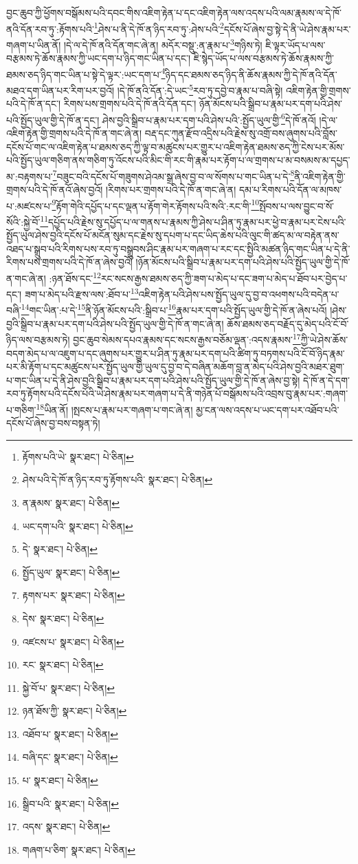 བྱང་ཆུབ་ཀྱི་ཕྱོགས་བསྒོམས་པའི་དབང་གིས་འཇིག་རྟེན་པ་དང་འཇིག་རྟེན་ལས་འདས་པའི་ལམ་རྣམས་ལ་དེ་ཁོ་ནའི་དོན་རབ་ཏུ་:རྟོགས་པའི་\footnote{རྟོགས་པའི་ཡེ་  སྣར་ཐང་།  པེ་ཅིན། }ཤེས་པ་ནི་དེ་ཁོ་ན་ཉིད་རབ་ཏུ་:ཤེས་པའི་\footnote{ཤེས་པའི་དེ་ཁོ་ན་ཉིད་རབ་ཏུ་རྟོགས་པའི་  སྣར་ཐང་།  པེ་ཅིན། }དངོས་པོ་ཞེས་བྱ་སྟེ་དེ་ནི་ཡེ་ཤེས་རྣམ་པར་གཞག་པ་ཡིན་ནོ། །དེ་ལ་དེ་ཁོ་ནའི་དོན་གང་ཞེ་ན། མདོར་བསྡུ་:ན་རྣམ་པ་\footnote{ན་རྣམས་  སྣར་ཐང་།  པེ་ཅིན། }གཉིས་ཏེ། ཇི་ལྟར་ཡོད་པ་ལས་བརྩམས་ཏེ་ཆོས་རྣམས་ཀྱི་ཡང་དག་པ་ཉིད་གང་ཡིན་པ་དང་། ཇི་སྙེད་ཡོད་པ་ལས་བརྩམས་ཏེ་ཆོས་རྣམས་ཀྱི་ཐམས་ཅད་ཉིད་གང་ཡིན་པ་སྟེ་དེ་ལྟར་:ཡང་དག་པ་\footnote{ཡང་དག་པའི་  སྣར་ཐང་།  པེ་ཅིན། }ཉིད་དང་ཐམས་ཅད་ཉིད་ནི་ཆོས་རྣམས་ཀྱི་དེ་ཁོ་ནའི་དོན་མཐའ་དག་ཡིན་པར་རིག་པར་བྱའོ། །དེ་ཁོ་ནའི་དོན་:དེ་ཡང་\footnote{དེ་  སྣར་ཐང་།  པེ་ཅིན། }རབ་ཏུ་དབྱེ་བ་རྣམ་པ་བཞི་སྟེ། འཇིག་རྟེན་གྱི་གྲགས་པའི་དེ་ཁོ་ན་དང་། རིགས་པས་གྲགས་པའི་དེ་ཁོ་ནའི་དོན་དང་། ཉོན་མོངས་པའི་སྒྲིབ་པ་རྣམ་པར་དག་པའི་ཤེས་པའི་སྤྱོད་ཡུལ་གྱི་དེ་ཁོ་ན་དང་། ཤེས་བྱའི་སྒྲིབ་པ་རྣམ་པར་དག་པའི་ཤེས་པའི་:སྤྱོད་ཡུལ་གྱི་\footnote{སྤྱོད་ཡུལ་  སྣར་ཐང་།  པེ་ཅིན། }དེ་ཁོ་ནའོ། །དེ་ལ་འཇིག་རྟེན་གྱི་གྲགས་པའི་དེ་ཁོ་ན་གང་ཞེ་ན། བརྡ་དང་ཀུན་རྫོབ་འདྲིས་པའི་རྗེས་སུ་འགྲོ་བས་ཞུགས་པའི་བློས་དངོས་པོ་གང་ལ་འཇིག་རྟེན་པ་ཐམས་ཅད་ཀྱི་ལྟ་བ་མཚུངས་པར་གྱུར་པ་འཇིག་རྟེན་ཐམས་ཅད་ཀྱི་ངེས་པར་མོས་པའི་སྤྱོད་ཡུལ་གཅིག་ནས་གཅིག་ཏུ་འོངས་པའི་མིང་གི་རང་གི་རྣམ་པར་རྟོག་པ་ལ་གྲགས་པ་མ་བསམས་མ་དཔྱད་མ་:བརྟགས་པ་\footnote{རྟགས་པར་  སྣར་ཐང་།  པེ་ཅིན། }བཟུང་བའི་དངོས་པོ་གཟུགས་ཤེའམ་སྒྲ་ཞེས་བྱ་བ་ལ་སོགས་པ་གང་ཡིན་པ་དེ་\footnote{དེས་  སྣར་ཐང་།  པེ་ཅིན། }ནི་འཇིག་རྟེན་གྱི་གྲགས་པའི་དེ་ཁོ་ནའོ་ཞེས་བྱའོ། །རིགས་པར་གྲགས་པའི་དེ་ཁོ་ན་གང་ཞེ་ན། དམ་པ་རིགས་པའི་དོན་ལ་མཁས་པ་:མཛངས་པ་\footnote{འཛངས་པ་  སྣར་ཐང་།  པེ་ཅིན། }རྟོག་གེའི་དཔྱོད་པ་དང་ལྡན་པ་རྟོག་གེར་རྟོགས་པའི་སའི་:རང་གི་\footnote{རང་  སྣར་ཐང་།  པེ་ཅིན། }སྤོབས་པ་ལས་བྱུང་བ་སོ་སོའི་:སྐྱེ་བོ་\footnote{སྐྱེ་བོ་པ་  སྣར་ཐང་།  པེ་ཅིན། }དཔྱོད་པའི་རྗེས་སུ་དཔྱོད་པ་ལ་གནས་པ་རྣམས་ཀྱི་ཤེས་པ་ཤིན་ཏུ་རྣམ་པར་ཕྱེ་བ་རྣམ་པར་ངེས་པའི་སྤྱོད་ཡུལ་ཤེས་བྱའི་དངོས་པོ་མངོན་སུམ་དང་རྗེས་སུ་དཔག་པ་དང་ཡིད་ཆེས་པའི་ལུང་གི་ཚད་མ་ལ་བརྟེན་ནས་འཐད་པ་སྒྲུབ་པའི་རིགས་པས་རབ་ཏུ་བསྒྲུབས་ཤིང་རྣམ་པར་གཞག་པ་རང་དང་སྤྱིའི་མཚན་ཉིད་གང་ཡིན་པ་དེ་ནི་རིགས་པས་གྲགས་པའི་དེ་ཁོ་ན་ཞེས་བྱའོ། །ཉོན་མོངས་པའི་སྒྲིབ་པ་རྣམ་པར་དག་པའི་ཤེས་པའི་སྤྱོད་ཡུལ་གྱི་དེ་ཁོ་ན་གང་ཞེ་ན། :ཉན་ཐོས་དང་\footnote{ཉན་ཐོས་ཀྱི་  སྣར་ཐང་།  པེ་ཅིན། }རང་སངས་རྒྱས་ཐམས་ཅད་ཀྱི་ཟག་པ་མེད་པ་དང་ཟག་པ་མེད་པ་ཐོབ་པར་བྱེད་པ་དང་། ཟག་པ་མེད་པའི་རྫས་ལས་:ཐོབ་པ་\footnote{འཐོབ་པ་  སྣར་ཐང་།  པེ་ཅིན། }འཇིག་རྟེན་པའི་ཤེས་པས་སྤྱོད་ཡུལ་དུ་བྱ་བ་འཕགས་པའི་བདེན་པ་བཞི་\footnote{བཞི་དང་  སྣར་ཐང་།  པེ་ཅིན། }གང་ཡིན་:པ་དེ་\footnote{པ་  སྣར་ཐང་།  པེ་ཅིན། }ནི་ཉོན་མོངས་པའི་:སྒྲིབ་པ་\footnote{སྒྲིབ་པའི་  སྣར་ཐང་།  པེ་ཅིན། }རྣམ་པར་དག་པའི་སྤྱོད་ཡུལ་གྱི་དེ་ཁོ་ན་ཞེས་པའོ། །ཤེས་བྱའི་སྒྲིབ་པ་རྣམ་པར་དག་པའི་ཤེས་པའི་སྤྱོད་ཡུལ་གྱི་དེ་ཁོ་ན་གང་ཞེ་ན། ཆོས་ཐམས་ཅད་བརྗོད་དུ་མེད་པའི་ངོ་བོ་ཉིད་ལས་བརྩམས་ཏེ། བྱང་ཆུབ་སེམས་དཔའ་རྣམས་དང་སངས་རྒྱས་བཅོམ་ལྡན་:འདས་རྣམས་\footnote{འདས་  སྣར་ཐང་།  པེ་ཅིན། }ཀྱི་ཡེ་ཤེས་ཆོས་བདག་མེད་པ་ལ་འཇུག་པ་དང་ཞུགས་པར་གྱུར་པ་ཤིན་ཏུ་རྣམ་པར་དག་པའི་ཚིག་ཏུ་བཏགས་པའི་ངོ་བོ་ཉིད་རྣམ་པར་མི་རྟོག་པ་དང་མཚུངས་པར་སྤྱོད་ཡུལ་གྱི་ཡུལ་དུ་བྱ་བ་དེ་བཞིན་མཆོག་བླ་ན་མེད་པའི་ཤེས་བྱའི་མཐར་ཐུག་པ་གང་ཡིན་པ་དེ་ནི་ཤེས་བྱའི་སྒྲིབ་པ་རྣམ་པར་དག་པའི་ཤེས་པའི་སྤྱོད་ཡུལ་གྱི་དེ་ཁོ་ན་ཞེས་བྱ་སྟེ། དེ་ཁོ་ན་དེ་དག་རབ་ཏུ་རྟོགས་པའི་དངོས་པོའི་ཡེ་ཤེས་རྣམ་པར་གཞག་པ་དེ་ནི་གཉེན་པོ་བསྒོམས་པའི་འབྲས་བུ་རྣམ་པར་:གཞག་པ་གཅིག་\footnote{གཞག་པ་ཅིག་  སྣར་ཐང་།  པེ་ཅིན། }ཡིན་ནོ། །སྤངས་པ་རྣམ་པར་གཞག་པ་གང་ཞེ་ན། མྱ་ངན་ལས་འདས་པ་ཡང་དག་པར་འཐོབ་པའི་དངོས་པོ་ཞེས་བྱ་བས་བསྟན་ཏེ། 